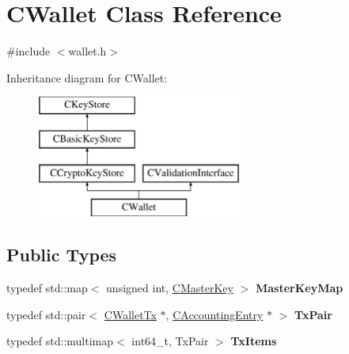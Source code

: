\hypertarget{class_c_wallet}{}\section{C\+Wallet Class Reference}
\label{class_c_wallet}


{\ttfamily \#include $<$wallet.\+h$>$}

Inheritance diagram for C\+Wallet\+:\begin{figure}[H]
\begin{center}
\leavevmode
\includegraphics[height=4.000000cm]{class_c_wallet}
\end{center}
\end{figure}
\subsection*{Public Types}
\begin{DoxyCompactItemize}
\item 
\mbox{\label{class_c_wallet_a0e21167a320a0ab8f15d0e11c6749a0e}} 
typedef std\+::map$<$ unsigned int, \mbox{\hyperlink{class_c_master_key}{C\+Master\+Key}} $>$ {\bfseries Master\+Key\+Map}
\item 
\mbox{\label{class_c_wallet_ad1557a7d200f70bc97319376a24c98a7}} 
typedef std\+::pair$<$ \mbox{\hyperlink{class_c_wallet_tx}{C\+Wallet\+Tx}} $\ast$, \mbox{\hyperlink{class_c_accounting_entry}{C\+Accounting\+Entry}} $\ast$ $>$ {\bfseries Tx\+Pair}
\item 
\mbox{\label{class_c_wallet_a03b42ca49a478ae8089e096d498d1dfe}} 
typedef std\+::multimap$<$ int64\+\_\+t, Tx\+Pair $>$ {\bfseries Tx\+Items}
\end{DoxyCompactItemize}
